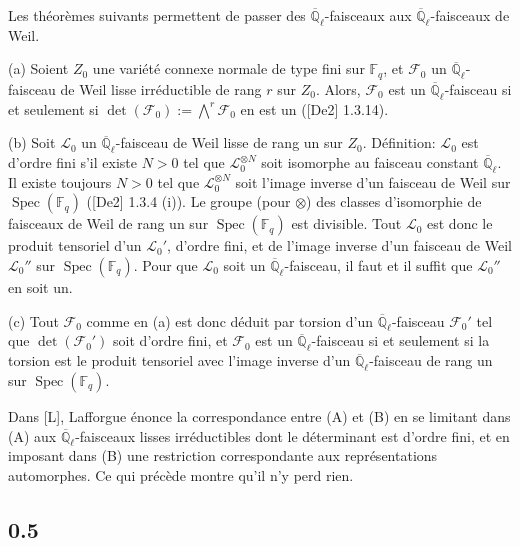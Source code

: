 \documentclass[10pt,a4paper]{article}
\theoremstyle{plain}
\theoremstyle{definition}
\DeclareMathOperator{\Spec}{Spec}
\begin{document}
Les th\'eor\`emes suivants permettent de passer des $\overline{\mathbb{Q}}_\ell$-faisceaux aux $\overline{\mathbb{Q}}_\ell$-faisceaux de Weil.

(a) Soient $Z_0$ une vari\'et\'e connexe normale de type fini sur $\mathbb{F}_q$, et $\mathcal{F}_0$ un $\overline{\mathbb{Q}}_\ell$-faisceau de Weil lisse irr\'eductible de rang $r$ sur $Z_0$. Alors, $\mathcal{F}_0$ est un $\overline{\mathbb{Q}}_\ell$-faisceau si et seulement si $\det(\mathcal{F}_0) := \bigwedge^r \mathcal{F}_0$ en est un ([De2] 1.3.14).

(b) Soit $\mathcal{L}_0$ un $\overline{\mathbb{Q}}_\ell$-faisceau de Weil lisse de rang un sur $Z_0$. D\'efinition: $\mathcal{L}_0$ est d'ordre fini s'il existe $N > 0$ tel que $\mathcal{L}_0^{\otimes N}$ soit isomorphe au faisceau constant $\overline{\mathbb{Q}}_\ell$. Il existe toujours $N > 0$ tel que $\mathcal{L}_0^{\otimes N}$ soit l'image inverse d'un faisceau de Weil sur $\Spec(\mathbb{F}_q)$ ([De2] 1.3.4 (i)). Le groupe (pour $\otimes$) des classes d'isomorphie de faisceaux de Weil de rang un sur $\Spec(\mathbb{F}_q)$ est divisible. Tout $\mathcal{L}_0$ est donc le produit tensoriel d'un $\mathcal{L}_0'$, d'ordre fini, et de l'image inverse d'un faisceau de Weil $\mathcal{L}_0''$ sur $\Spec(\mathbb{F}_q)$. Pour que $\mathcal{L}_0$ soit un $\overline{\mathbb{Q}}_\ell$-faisceau, il faut et il suffit que $\mathcal{L}_0''$ en soit un.

(c) Tout $\mathcal{F}_0$ comme en (a) est donc d\'eduit par torsion d'un $\overline{\mathbb{Q}}_\ell$-faisceau $\mathcal{F}_0'$ tel que $\det(\mathcal{F}_0')$ soit d'ordre fini, et $\mathcal{F}_0$ est un $\overline{\mathbb{Q}}_\ell$-faisceau si et seulement si la torsion est le produit tensoriel avec l'image inverse d'un $\overline{\mathbb{Q}}_\ell$-faisceau de rang un sur $\Spec(\mathbb{F}_q)$.

Dans [L], Lafforgue \'enonce la correspondance entre (A) et (B) en se limitant dans (A) aux $\overline{\mathbb{Q}}_\ell$-faisceaux lisses irr\'eductibles dont le d\'eterminant est d'ordre fini, et en imposant dans (B) une restriction correspondante aux repr\'esentations automorphes. Ce qui pr\'ec\`ede montre qu'il n'y perd rien.

\subsection*{0.5}
\end{document}
